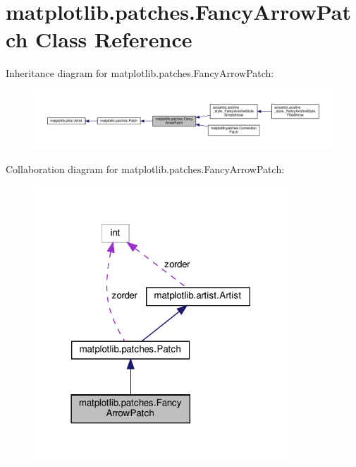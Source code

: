 \hypertarget{classmatplotlib_1_1patches_1_1FancyArrowPatch}{}\section{matplotlib.\+patches.\+Fancy\+Arrow\+Patch Class Reference}
\label{classmatplotlib_1_1patches_1_1FancyArrowPatch}


Inheritance diagram for matplotlib.\+patches.\+Fancy\+Arrow\+Patch\+:
\nopagebreak
\begin{figure}[H]
\begin{center}
\leavevmode
\includegraphics[width=350pt]{classmatplotlib_1_1patches_1_1FancyArrowPatch__inherit__graph}
\end{center}
\end{figure}


Collaboration diagram for matplotlib.\+patches.\+Fancy\+Arrow\+Patch\+:
\nopagebreak
\begin{figure}[H]
\begin{center}
\leavevmode
\includegraphics[width=270pt]{classmatplotlib_1_1patches_1_1FancyArrowPatch__coll__graph}
\end{center}
\end{figure}
